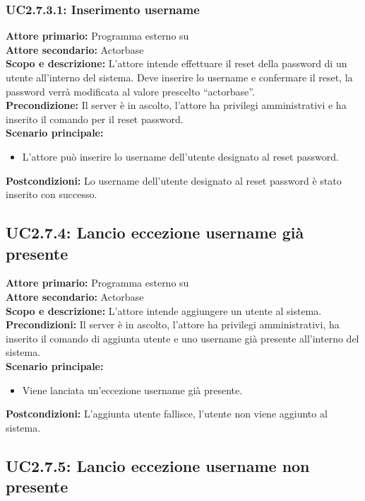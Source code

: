 \documentclass{scalatekids-article}
\begin{document}
\subsubsection{UC2.7.3.1: Inserimento username}

\textbf{Attore primario:} Programma esterno su \\
\textbf{Attore secondario:} Actorbase\\
\textbf{Scopo e descrizione:} L'attore intende effettuare il reset della password di un utente all'interno del sistema. Deve inserire lo username e confermare il reset, la password
verrà modificata al valore prescelto ``actorbase''.\\
\textbf{Precondizione:} Il server è in ascolto, l'attore ha privilegi amministrativi e ha inserito il comando per il reset password.\\
\textbf{Scenario principale:}
\begin{itemize}
\item L'attore può inserire lo username dell'utente designato al reset password.
\end{itemize}
\textbf{Postcondizioni:} Lo username dell'utente designato al reset password è stato inserito con successo.

\subsection{UC2.7.4: Lancio eccezione username già presente}

\textbf{Attore primario:} Programma esterno su \\
\textbf{Attore secondario:} Actorbase\\
\textbf{Scopo e descrizione:}
L'attore intende aggiungere un utente al sistema.\\
\textbf{Precondizioni:} Il server è in ascolto, l'attore ha privilegi amministrativi, ha inserito il comando di aggiunta utente e uno username già presente all'interno del sistema.\\
\textbf{Scenario principale:}
\begin{itemize}
\item Viene lanciata un'eccezione username già presente.
\end{itemize}
\textbf{Postcondizioni:} L'aggiunta utente fallisce, l'utente non viene aggiunto al sistema.

\subsection{UC2.7.5: Lancio eccezione username non presente}
\end{document}

